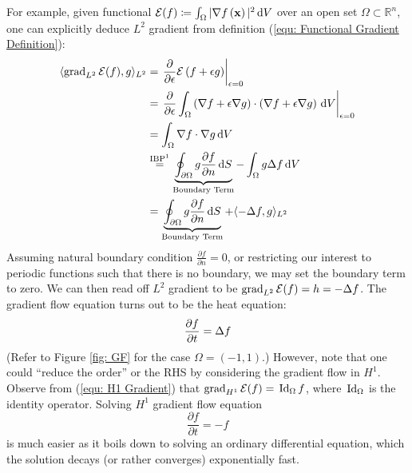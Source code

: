 \documentclass[../dissertation.tex]{subfiles}
\begin{document}
\begin{example}
    For example, given functional $\mathcal{E} (f) \coloneqq \int_{\Omega} |\nabla f \left( \mathbf{x} \right)|^2 \, \text{d} V$ over an open set $\Omega \subset \mathbb{R}^n$,
    one can explicitly deduce $L^2$ gradient from definition (\ref{equ: Functional Gradient Definition}):
    \begin{align*}
        \inner{\grad_{L^2} \mathcal{E} (f), g}_{L^2} &= \left.\frac{\partial}{\partial \epsilon} \mathcal{E} \left( f + \epsilon g \right)\right|_{\epsilon=0} \\
            &= \left.\frac{\partial}{\partial \epsilon} \int_{\Omega} \left( \nabla f + \epsilon \nabla g \right) \cdot \left( \nabla f + \epsilon \nabla g \right) \intd V\right|_{\epsilon=0} \\
                &= \int_{\Omega} \nabla f \cdot \nabla g \intd V \\
                &\stackrel{\text{IBP\footnotemark}}{=} \underbrace{\oint_{\partial \Omega} g \frac{\partial f}{\partial n} \intd S}_{\text{Boundary Term}} - \int_{\Omega} g \laplacian f \intd V \\
                &= \underbrace{\oint_{\partial \Omega} g \frac{\partial f}{\partial n} \intd S}_{\text{Boundary Term}} + \inner{-\laplacian f, g}_{L^2}
            \end{align*}
            Assuming natural boundary condition $\frac{\partial f}{\partial n} = 0$, or restricting our interest to periodic functions such that there is no boundary, we may set the boundary term to zero.
            We can then read off $L^2$ gradient to be $\operatorname{grad}_{L^2} \mathcal{E} (f) = h = -\Delta f$. 
            The gradient flow equation turns out to be the heat equation:
            \begin{equation}
                \frac{\partial f}{\partial t} = \Delta f
            \end{equation}
            (Refer to Figure \ref{fig: GF} for the case $\Omega = (-1, 1)$.)
            However, note that one could ``reduce the order'' or the RHS by considering the gradient flow in $H^1$.
            Observe from (\ref{equ: H1 Gradient}) that $\operatorname{grad}_{H^1} \mathcal{E} (f) = \, \text{Id}_{\Omega} \, f$, where $\, \text{Id}_{\Omega}$ is the identity operator.
            Solving $H^1$ gradient flow equation
            \begin{equation}
                \frac{\partial f}{\partial t} = -f
    \end{equation}
    is much easier as it boils down to solving an ordinary differential equation,
    which the solution decays (or rather converges) exponentially fast.


\end{example}
\end{document}
